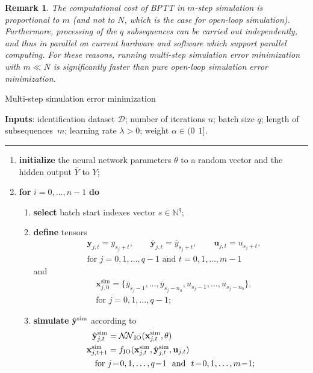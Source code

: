 \documentclass{article}
\renewcommand{\theenumi}{\arabic{enumi}}
\renewcommand{\theenumii}{\arabic{enumii}}
\newtheorem{remark}{Remark}{\normalfont}{\normalfont}
\newcommand{\NN}{\mathcal{N\!N}} %
\newcommand{\batchsize}{q}
\newcommand{\seqlen}{m}
\newcommand{\numiter}{n}
\newcommand{\nsamp}{N}
\newcommand{\tens}[1]{\mathbf{#1}}
\newcommand{\Yid}{Y}
\newcommand{\Did}{{\mathcal{D}}}
\newcommand{\hidden}[1]{\overline{#1}}
\begin{document}
\begin{remark}
The computational cost of BPTT in $\seqlen$-step simulation is  proportional to $\seqlen$ (and not to $\nsamp$, which is the case for open-loop simulation). Furthermore, processing of the $\batchsize$ subsequences can be carried out independently, and thus in parallel on current hardware and software which support parallel computing. For these reasons, running multi-step simulation error minimization with $\seqlen \ll \nsamp$  is significantly faster than pure open-loop simulation error minimization.
\end{remark}

\begin{algorithm}%
	\caption{Multi-step simulation error minimization}
	\label{algo:minibatch}
\small
	\textbf{Inputs}: identification dataset $\Did$; number of iterations $n$; batch size $\batchsize$; length of subsequences~$\seqlen$; learning rate $\lambda>0$;  weight $\alpha \in (0 \ \ 1]$.
\vspace*{-.0cm}\hrule\vspace*{.0cm}
	\begin{enumerate}[label=\arabic*., ref=\theenumi{}]
        \item  \textbf{initialize} the neural network parameters $\theta$ to a random vector   and the hidden output $\hidden{Y}$ to $\Yid$;
		\item  \textbf{for} $i=0,\ldots,\numiter-1$ \textbf{do}
		\begin{enumerate}[label=\theenumi{}.\arabic*., ref=\theenumi{}.\theenumii{}]
			\item \textbf{select} batch start indexes vector $s \in \mathbb{N}^q$;
			\item \textbf{define} tensors
			\begin{align*}
			& {{\tens{y}}}_{j,t}=y_{s_j+t}, \qquad
			 \hidden{{\tens{y}}}_{j,t}=\hidden{y}_{s_j+t}, \qquad
			 {{\tens{u}}}_{j,t}=u_{s_j+t}, \\
			 & \textrm{for  } j\!=\!0,1,\dots,\batchsize\!-\!1 \textrm{\ \ and\ \ } t\!=\!0,1,\dots,\seqlen\!-\!1
			\end{align*}
			and
			\begin{align*}
			& \tens{x}^{\mathrm{sim}}_{j,0} = \{\hidden{y}_{s_j-1}, \dots,   \hidden{y}_{s_j-n_a}, u_{s_j-1}, \dots, u_{s_j-n_b} \}, \\
			& \textrm{for  } j\!=\!0,1,\dots,\batchsize\!-\!1;
			\end{align*}
			\item \textbf{simulate} $\hat{\tens{y}}^{\rm sim}$ according to 
			\begin{align*} 
					\hat {\tens{y}}_{j,t}^{\mathrm{sim}}  &= \NN_{\rm IO}( {\tens{x}}_{j,t}^{\mathrm{sim}},\theta) \\%
					{\tens{x}}^{\mathrm{sim}}_{j,t+1} &= f_{\rm IO}({\tens{x}}^{\mathrm{sim}}_{j,t}, \hat {\tens{y}}_{j,t}^{\mathrm{sim}}, {\tens{u}}_{j,t}) \\
					\! \textrm{for  } & j\!=\!0,1,\dots,\batchsize\!-\!1 \textrm{\ \ and\ \ } t\!=\!0,1,\dots,\seqlen\!-\!1; 
			\end{align*} 
			

\end{enumerate}
\end{enumerate}
\end{algorithm}
\end{document}
